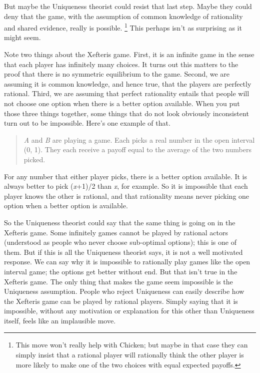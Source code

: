 \documentclass[
  11pt,
  letterpaper,
  DIV=11,
  numbers=noendperiod,
  twoside]{scrartcl}
\begin{document}
But maybe the Uniqueness theorist could resist that last step. Maybe
they could deny that the game, with the assumption of common knowledge
of rationality and shared evidence, really is possible. \footnote{This
  move won't really help with Chicken; but maybe in that case they can
  simply insist that a rational player will rationally think the other
  player is more likely to make one of the two choices with equal
  expected payoffs.} This perhaps isn't as surprising as it might seem.

Note two things about the Xefteris game. First, it is an infinite game
in the sense that each player has infinitely many choices. It turns out
this matters to the proof that there is no symmetric equilibrium to the
game. Second, we are assuming it is common knowledge, and hence true,
that the players are perfectly rational. Third, we are assuming that
perfect rationality entails that people will not choose one option when
there is a better option available. When you put those three things
together, some things that do not look obviously inconsistent turn out
to be impossible. Here's one example of that.

\begin{quote}
\emph{A} and \emph{B} are playing a game. Each picks a real number in
the open interval (0, 1). They each receive a payoff equal to the
average of the two numbers picked.
\end{quote}

For any number that either player picks, there is a better option
available. It is always better to pick (\emph{x}+1)/2 than \emph{x}, for
example. So it is impossible that each player knows the other is
rational, and that rationality means never picking one option when a
better option is available.

So the Uniqueness theorist could say that the same thing is going on in
the Xefteris game. Some infinitely games cannot be played by rational
actors (understood as people who never choose sub-optimal options); this
is one of them. But if this is all the Uniqueness theorist says, it is
not a well motivated response. We can say why it is impossible to
rationally play games like the open interval game; the options get
better without end. But that isn't true in the Xefteris game. The only
thing that makes the game seem impossible is the Uniqueness assumption.
People who reject Uniqueness can easily describe how the Xefteris game
can be played by rational players. Simply saying that it is impossible,
without any motivation or explanation for this other than Uniqueness
itself, feels like an implausible move.
\end{document}
